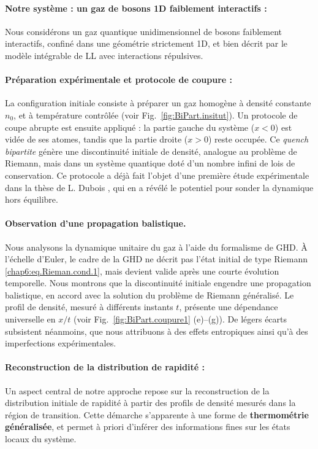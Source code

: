 \paragraph{Notre système : un gaz de bosons 1D faiblement interactifs :}
Nous considérons un gaz quantique unidimensionnel de bosons faiblement interactifs, confiné dans une géométrie strictement 1D, et bien décrit par le modèle intégrable de \gls{LL} avec interactions répulsives. %

\paragraph{Préparation expérimentale et protocole de coupure :}
La configuration initiale consiste à préparer un gaz homogène à densité constante $n_0$, et à température contrôlée (voir Fig.~\ref{fig:BiPart.insitut}). Un protocole de coupe abrupte est ensuite appliqué : la partie gauche du système ($x<0$) est vidée de ses atomes, tandis que la partie droite ($x>0$) reste occupée. Ce \emph{quench bipartite} génère une discontinuité initiale de densité, analogue au problème de Riemann, mais dans un système quantique doté d’un nombre infini de lois de conservation. Ce protocole a déjà fait l’objet d’une première étude expérimentale dans la thèse de L. Dubois \cite{L.Dubois2024}, qui en a révélé le potentiel pour sonder la dynamique hors équilibre.

\paragraph{Observation d’une propagation balistique.}
Nous analysons la dynamique unitaire du gaz à l’aide du formalisme de \gls{GHD}.  
À l’échelle d’Euler, le cadre de la \gls*{GHD} ne décrit pas l’état initial de type Riemann \eqref{chap6:eq.Rieman.cond.1}, mais devient valide après une courte évolution temporelle.  
Nous montrons que la discontinuité initiale engendre une propagation balistique, en accord avec la solution du problème de Riemann généralisé.  
Le profil de densité, mesuré à différents instants $t$, présente une dépendance universelle en $x/t$ (voir Fig.~\ref{fig:BiPart.coupure1} (e)--(g)).  
De légers écarts subsistent néanmoins, que nous attribuons à des effets entropiques ainsi qu’à des imperfections expérimentales.


\paragraph{Reconstruction de la distribution de rapidité :}
Un aspect central de notre approche repose sur la reconstruction de la distribution initiale de rapidité à partir des profils de densité mesurés dans la région de transition. Cette démarche s’apparente à une forme de {\bf thermométrie généralisée}, et permet à priori d’inférer des informations fines sur les états locaux du système.


